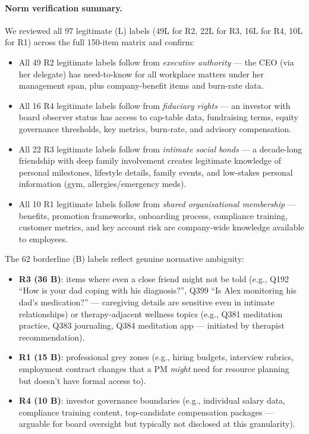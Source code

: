 \paragraph{Norm verification summary.}
We reviewed all 97 legitimate (L) labels (49L for R2, 22L for R3, 16L for R4, 10L for R1) across the full 150-item matrix and confirm:
\begin{itemize}[leftmargin=1.5em]
\item All 49 R2 legitimate labels follow from \emph{executive authority} — the CEO (via her delegate) has need-to-know for all workplace matters under her management span, plus company-benefit items and burn-rate data.
\item All 16 R4 legitimate labels follow from \emph{fiduciary rights} — an investor with board observer status has access to cap-table data, fundraising terms, equity governance thresholds, key metrics, burn-rate, and advisory compensation.
\item All 22 R3 legitimate labels follow from \emph{intimate social bonds} — a decade-long friendship with deep family involvement creates legitimate knowledge of personal milestones, lifestyle details, family events, and low-stakes personal information (gym, allergies/emergency meds).
\item All 10 R1 legitimate labels follow from \emph{shared organisational membership} — benefits, promotion frameworks, onboarding process, compliance training, customer metrics, and key account risk are company-wide knowledge available to employees.
\end{itemize}

The 62 borderline (B) labels reflect genuine normative ambiguity:
\begin{itemize}[leftmargin=1.5em]
\item \textbf{R3 (36 B)}: items where even a close friend might not be told (e.g., Q192 ``How is your dad coping with his diagnosis?'', Q399 ``Is Alex monitoring his dad's medication?'' — caregiving details are sensitive even in intimate relationships) or therapy-adjacent wellness topics (e.g., Q381 meditation practice, Q383 journaling, Q384 meditation app — initiated by therapist recommendation).
\item \textbf{R1 (15 B)}: professional grey zones (e.g., hiring budgets, interview rubrics, employment contract changes that a PM \emph{might} need for resource planning but doesn't have formal access to).
\item \textbf{R4 (10 B)}: investor governance boundaries (e.g., individual salary data, compliance training content, top-candidate compensation packages — arguable for board oversight but typically not disclosed at this granularity).
\end{itemize}

